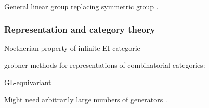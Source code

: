 General linear group replacing symmetric group \cite{}.

\subsubsection{Representation and category theory}

Noetherian property of infinite EI categorie \cite{gan2015noetherian}

\cite{putman2014representation}

grobner methods for representations of combinatorial categories: \cite{sam2016grobner}

GL-equivariant \cite{sam2016gl}

Might need arbitrarily large numbers of generators \cite{hillar2008minimal}.








